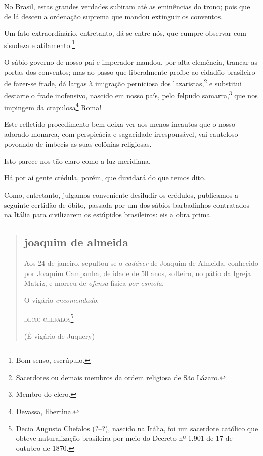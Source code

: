 No Brasil, estas grandes verdades subiram até as eminências do trono;
pois que de lá desceu a ordenação suprema que mandou extinguir os
conventos.

Um fato extraordinário, entretanto, dá-se entre nós, que cumpre observar
com sisudeza e atilamento.\footnote{Bom senso, escrúpulo.}

O sábio governo de nosso pai e imperador mandou, por alta clemência,
trancar as portas dos conventos; mas ao passo que liberalmente proíbe ao
cidadão brasileiro de fazer-se frade, dá largas à imigração perniciosa
dos lazaristas,\footnote{Sacerdotes ou demais membros da ordem
  religiosa de São Lázaro.} e substitui destarte o frade inofensivo,
nascido em nosso país, pelo felpudo samarra,\footnote{Membro do clero.}
que nos impingem da crapulosa\footnote{Devassa, libertina.} Roma!

Este refletido procedimento bem deixa ver aos menos incautos que o nosso
adorado monarca, com perspicácia e sagacidade irresponsável, vai
cauteloso povoando de imbecis as suas colônias religiosas.

Isto parece-nos tão claro como a luz meridiana.

Há por aí gente crédula, porém, que duvidará do que temos dito.

Como, entretanto, julgamos conveniente desiludir os crédulos, publicamos
a seguinte certidão de óbito, passada por um dos sábios barbadinhos
contratados na Itália para civilizarem os estúpidos brasileiros: eis a
obra prima.

\begin{quote}
\subsection{joaquim de almeida}

Aos 24 de janeiro, sepultou-se o \emph{cadáver} de Joaquim de
Almeida, conhecido por Joaquim Campanha, de idade de 50 anos, solteiro,
no pátio da Igreja Matriz, e morreu de \emph{ofensa} física
\emph{por esmola}.

O vigário \emph{encomendado}.

\begin{flushright}
\textsc{decio chefalos}\footnote{Decio Augusto Chefalos (?--?), nascido na
  Itália, foi um sacerdote católico que obteve naturalização brasileira
  por meio do Decreto nº 1.901 de 17 de outubro de 1870.}

(É vigário de Juquery)
\end{flushright}
\end{quote}

